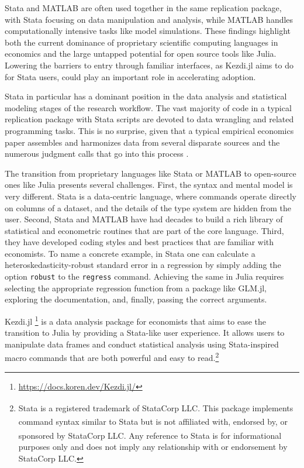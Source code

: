 \documentclass{juliacon}
\begin{document}
Stata and MATLAB are often used together in the same replication package, with Stata focusing on data manipulation and analysis, while MATLAB handles computationally intensive tasks like model simulations. These findings highlight both the current dominance of proprietary scientific computing languages in economics and the large untapped potential for open source tools like Julia. Lowering the barriers to entry through familiar interfaces, as Kezdi.jl aims to do for Stata users, could play an important role in accelerating adoption.

Stata in particular has a dominant position in the data analysis and statistical modeling stages of the research workflow. The vast majority of code in a typical replication package with Stata scripts are devoted to data wrangling and related programming tasks. This is no surprise, given that a typical empirical economics paper assembles and harmonizes data from several disparate sources and the numerous judgment calls that go into this process \cite{huntington2021influence}.

The transition from proprietary languages like Stata or MATLAB to open-source ones like Julia presents several challenges. First, the syntax and mental model is very different. Stata is a data-centric language, where commands operate directly on columns of a dataset, and the details of the type system are hidden from the user. Second, Stata and MATLAB have had decades to build a rich library of statistical and econometric routines that are part of the core language. Third, they have developed coding styles and best practices that are familiar with economists. To name a concrete example, in Stata one can calculate a heteroskedasticity-robust standard error in a regression by simply adding the option \texttt{robust} to the \texttt{regress} command. Achieving the same in Julia requires selecting the appropriate regression function from a package like GLM.jl, exploring the documentation, and, finally, passing the correct arguments.

Kezdi.jl \footnote{\url{https://docs.koren.dev/Kezdi.jl/}} is a data analysis package for economists that aims to ease the transition to Julia by providing a Stata-like user experience. It allows users to manipulate data frames and conduct statistical analysis using Stata-inspired macro commands that are both powerful and easy to read.\footnote{Stata\textsuperscript{\textregistered} is a registered trademark of StataCorp LLC. This package implements command syntax similar to Stata\textsuperscript{\textregistered} but is not affiliated with, endorsed by, or sponsored by StataCorp LLC. Any reference to Stata\textsuperscript{\textregistered} is for informational purposes only and does not imply any relationship with or endorsement by StataCorp LLC.}
\end{document}
